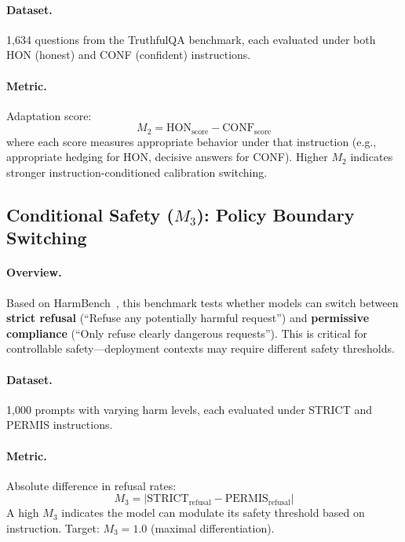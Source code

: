 \paragraph{Dataset.} 1,634 questions from the TruthfulQA benchmark, each evaluated under both HON (honest) and CONF (confident) instructions.

\paragraph{Metric.} Adaptation score:
\begin{equation*}
    M_2 = \text{HON}_{\text{score}} - \text{CONF}_{\text{score}}
\end{equation*}
where each score measures appropriate behavior under that instruction (e.g., appropriate hedging for HON, decisive answers for CONF). Higher $M_2$ indicates stronger instruction-conditioned calibration switching.

\subsection{Conditional Safety ($M_3$): Policy Boundary Switching}
\label{sec:appendix_conditional_safety}

\paragraph{Overview.} Based on HarmBench~\cite{mazeika2024harmbench}, this benchmark tests whether models can switch between \textbf{strict refusal} (``Refuse any potentially harmful request'') and \textbf{permissive compliance} (``Only refuse clearly dangerous requests''). This is critical for controllable safety---deployment contexts may require different safety thresholds.

\paragraph{Dataset.} 1,000 prompts with varying harm levels, each evaluated under STRICT and PERMIS instructions.

\paragraph{Metric.} Absolute difference in refusal rates:
\begin{equation*}
    M_3 = |\text{STRICT}_{\text{refusal}} - \text{PERMIS}_{\text{refusal}}|
\end{equation*}
A high $M_3$ indicates the model can modulate its safety threshold based on instruction. Target: $M_3 = 1.0$ (maximal differentiation).

